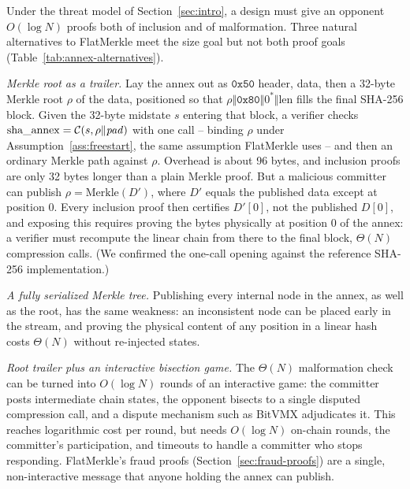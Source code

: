 Under the threat model of Section~\ref{sec:intro}, a design must give an
opponent $O(\log N)$ proofs both of inclusion and of malformation. Three
natural alternatives to FlatMerkle meet the size goal but not both proof
goals (Table~\ref{tab:annex-alternatives}).

\emph{Merkle root as a trailer.} Lay the annex out as $\texttt{0x50}$
header, data, then a 32-byte Merkle root $\rho$ of the data, positioned
so that $\rho \Vert \texttt{0x80} \Vert 0^{*} \Vert \mathrm{len}$ fills
the final SHA-256 block. Given the 32-byte midstate $s$ entering that
block, a verifier checks $\mathrm{sha\_annex} = \mathcal{C}(s, \rho \Vert
\mathit{pad})$ with one call -- binding $\rho$ under
Assumption~\ref{ass:freestart}, the same assumption FlatMerkle uses -- and
then an ordinary Merkle path against $\rho$. Overhead is about 96 bytes,
and inclusion proofs are only 32 bytes longer than a plain Merkle proof.
But a malicious committer can publish $\rho = \mathrm{Merkle}(D')$, where
$D'$ equals the published data except at position $0$. Every inclusion
proof then certifies $D'[0]$, not the published $D[0]$, and exposing this
requires proving the bytes physically at position $0$ of the annex: a
verifier must recompute the linear chain from there to the final block,
$\Theta(N)$ compression calls. (We confirmed the one-call opening against
the reference SHA-256 implementation.)

\emph{A fully serialized Merkle tree.} Publishing every internal node in
the annex, as well as the root, has the same weakness: an inconsistent
node can be placed early in the stream, and proving the physical content
of any position in a linear hash costs $\Theta(N)$ without re-injected
states.

\emph{Root trailer plus an interactive bisection game.} The $\Theta(N)$
malformation check can be turned into $O(\log N)$ rounds of an
interactive game: the committer posts intermediate chain states, the
opponent bisects to a single disputed compression call, and a dispute
mechanism such as BitVMX \citep{lerner2024bitvmx} adjudicates it. This
reaches logarithmic cost per round, but needs $O(\log N)$ on-chain rounds,
the committer's participation, and timeouts to handle a committer who
stops responding. FlatMerkle's fraud proofs (Section~\ref{sec:fraud-proofs})
are a single, non-interactive message that anyone holding the annex can
publish.

